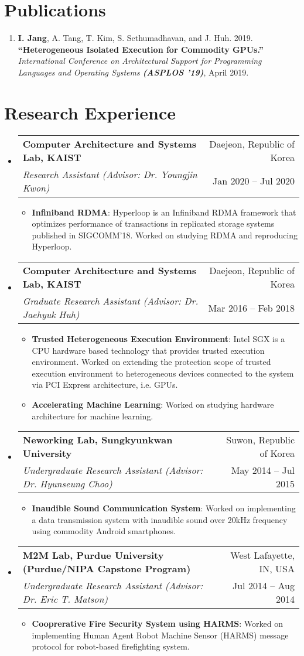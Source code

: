 \documentclass[letterpaper,oneside,12pt]{article}
\makeatletter
\newcommand{\resumeItem}[2]{
  \item\small{
    \textbf{#1}{: #2 \vspace{-2pt}}
  }
}
\newcommand{\resumeSubheading}[4]{
  \vspace{-1pt}\item
    \begin{tabular*}{0.97\textwidth}[t]{l@{\extracolsep{\fill}}r}
      \textbf{#1} & #2 \\
      \textit{\small#3} & \small #4 \\
    \end{tabular*}\vspace{-5pt}
}
\newcommand{\resumeSubHeadingListStart}{\begin{itemize}[leftmargin=*]}
\newcommand{\resumeSubHeadingListEnd}{\end{itemize}}
\newcommand{\resumeItemListStart}{\begin{itemize}}
\newcommand{\resumeItemListEnd}{\end{itemize}\vspace{-5pt}}
\makeatother
\begin{document}
\section{Publications}
\begin{enumerate}[leftmargin=*]
  \item \small \textbf{I. Jang}, A. Tang, T. Kim, S. Sethumadhavan, and J. Huh. 2019. \textbf{``Heterogeneous Isolated Execution for Commodity GPUs.''} \textit{International Conference on Architectural Support for Programming Languages and Operating Systems \textbf{(ASPLOS ’19)}}, April 2019.
\end{enumerate}

\section{Research Experience}
  \resumeSubHeadingListStart
    \resumeSubheading
      {Computer Architecture and Systems Lab, KAIST}{Daejeon, Republic of Korea}
      {Research Assistant (Advisor: Dr. Youngjin Kwon)}{Jan 2020 -- Jul 2020}
      \resumeItemListStart
        \resumeItem{Infiniband RDMA}
          {Hyperloop is an Infiniband RDMA framework that optimizes performance of transactions in replicated storage systems published in SIGCOMM'18. Worked on studying RDMA and reproducing Hyperloop.}
      \resumeItemListEnd
    \resumeSubheading
      {Computer Architecture and Systems Lab, KAIST}{Daejeon, Republic of Korea}
      {Graduate Research Assistant (Advisor: Dr. Jaehyuk Huh)}{Mar 2016 -- Feb 2018}
      \resumeItemListStart
        \resumeItem{Trusted Heterogeneous Execution Environment}
          {Intel SGX is a CPU hardware based technology that provides trusted execution environment. Worked on extending the protection scope of trusted execution environment to heterogeneous devices connected to the system via PCI Express architecture, i.e. GPUs.}
        \resumeItem{Accelerating Machine Learning}
          {Worked on studying hardware architecture for machine learning.}
      \resumeItemListEnd
    \resumeSubheading{Neworking Lab, Sungkyunkwan University}{Suwon, Republic of Korea}
      {Undergraduate Research Assistant (Advisor: Dr. Hyunseung Choo)}{May 2014 -- Jul 2015}
      \resumeItemListStart
        \resumeItem{Inaudible Sound Communication System}
          {Worked on implementing a data transmission system with inaudible sound over 20kHz frequency using commodity Android smartphones.}
      \resumeItemListEnd
    \resumeSubheading{M2M Lab, Purdue University \footnotesize{(Purdue/NIPA Capstone Program)}}{West Lafayette, IN, USA}
      {Undergraduate Research Assistant (Advisor: Dr. Eric T. Matson)}{Jul 2014 -- Aug 2014}
      \resumeItemListStart
        \resumeItem{Cooprerative Fire Security System using HARMS}
          {Worked on implementing Human Agent Robot Machine Sensor (HARMS) message protocol for robot-based firefighting system.}
      \resumeItemListEnd
  \resumeSubHeadingListEnd
\end{document}
